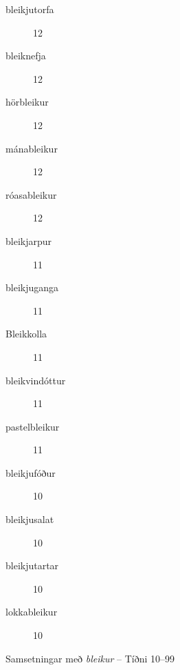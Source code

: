 \documentclass[../samsetningasafn.tex]{subfiles}
\begin{document}
\begin{bigwordlist}
\begin{footnotesize}
\begin{multicols}{4}
\begin{description}
		\item [bleikjutorfa]		12
		\item [bleiknefja]	12
		\item [hörbleikur]		12
		\item [mánableikur]	12
		\item [róasableikur]	12
		\item [bleikjarpur]	11
		\item [bleikjuganga]	11
		\item [Bleikkolla]		11
		\item [bleikvindóttur]	11
		\item [pastelbleikur]		11
		\item [bleikjufóður]		10
		\item [bleikjusalat]		10
		\item [bleikjutartar]		10
		\item [lokkableikur]		10
	\end{description}
\end{multicols}
\end{footnotesize}
	
\label{listi:bleik99}
\caption{Samsetningar með \textit{bleikur} -- Tíðni 10--99}
\end{bigwordlist}

\end{document}
